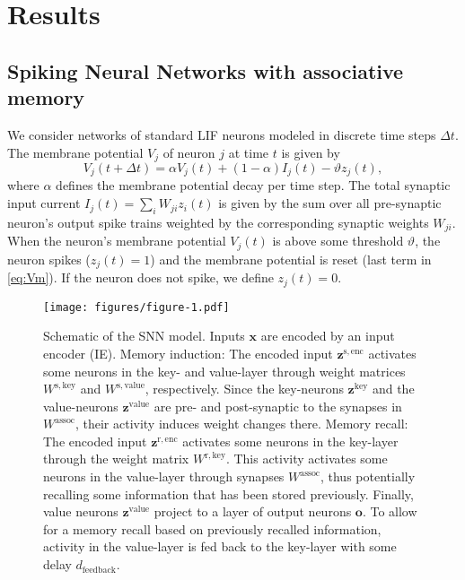 \documentclass{article}
\newcommand{\vm}[1]{\bm{#1}}
\begin{document}
\section{Results}
\label{sec:results}

\subsection{Spiking Neural Networks with associative memory}
\label{sec:results-model}
We consider networks of standard \gls{LIF} neurons modeled in discrete time steps $\Delta t$. The membrane potential $V_j$ of neuron $j$ at time $t$ is given by
\begin{equation}
\label{eq:Vm}
    V_j(t + \Delta t) = \alpha V_j(t) + (1 - \alpha) I_j(t) - \vartheta z_j(t),
\end{equation}
where $\alpha$ defines the membrane potential decay per time step. The total synaptic input current $I_j(t)= \sum_i W_{ji} z_i(t)$ is given by the sum over all pre-synaptic neuron's output spike trains weighted by the corresponding synaptic weights $W_{ji}$. When the neuron's membrane potential $V_j(t)$ is above some threshold $\vartheta$, the neuron spikes ($z_j(t)=1$) and the membrane potential is reset (last term in \eqref{eq:Vm}). If the neuron does not spike, we define $z_j(t)=0$.

\begin{figure}\centering
\texttt{[image: figures/figure-1.pdf]}
\caption{Schematic of the SNN model. Inputs $\vm{x}$ are encoded by an input encoder (IE). Memory induction: The encoded input $\vm{z}^\mathrm{s,enc}$ activates some neurons in the key- and value-layer through weight matrices $W^\mathrm{s,key}$ and $W^\mathrm{s,value}$, respectively. Since the key-neurons $\vm{z}^\mathrm{key}$ and the value-neurons $\vm{z}^\mathrm{value}$ are pre- and post-synaptic to the synapses in $W^\mathrm{assoc}$, their activity induces weight changes there. Memory recall: The encoded input $\vm{z}^\mathrm{r,enc}$ activates some neurons in the key-layer through the weight matrix $W^\mathrm{r,key}$. This activity activates some neurons in the value-layer through synapses $W^\mathrm{assoc}$, thus potentially recalling some information that has been stored previously. Finally, value neurons $\vm{z}^\mathrm{value}$ project to a layer of output neurons $\vm{o}$. To allow for a memory recall based on previously recalled information, activity in the value-layer is fed back to the key-layer with some delay $d_\mathrm{feedback}$.
}
\label{fig:fig1}
\end{figure}
\end{document}
